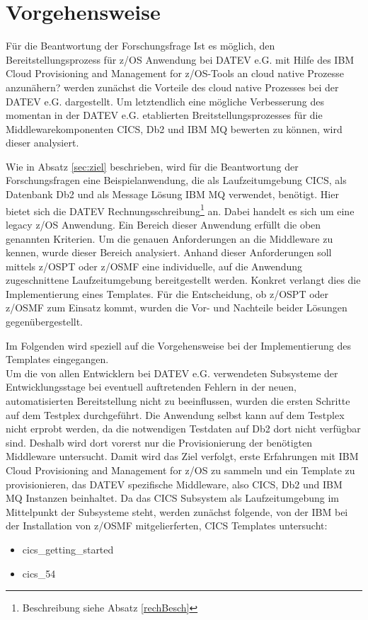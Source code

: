 \chapter{Vorgehensweise}\label{ch:vorgehensweise}
Für die Beantwortung der Forschungsfrage \glqq Ist es möglich, den Bereitstellungsprozess für z/OS Anwendung bei DATEV e.G. mit Hilfe des \glqq IBM Cloud Provisioning and Management for z/OS\grqq-Tools an cloud native Prozesse anzunähern?\grqq{} werden zunächst die Vorteile des cloud native Prozesses bei der DATEV e.G. dargestellt.
Um letztendlich eine mögliche Verbesserung des momentan in der DATEV e.G. etablierten Breitstellungsprozesses für die Middlewarekomponenten CICS, Db2 und IBM MQ bewerten zu können, wird dieser analysiert.

Wie in Absatz \ref{sec:ziel} beschrieben, wird für die Beantwortung der Forschungsfragen eine Beispielanwendung, die als Laufzeitumgebung CICS, als Datenbank Db2 und als Message Lösung IBM MQ verwendet, benötigt.
Hier bietet sich die \glqq DATEV Rechnungsschreibung\grqq{}\footnote{Beschreibung siehe Absatz \ref{rechBesch}} an.
Dabei handelt es sich um eine legacy z/OS Anwendung. Ein Bereich dieser Anwendung erfüllt die oben genannten Kriterien.
Um die genauen Anforderungen an die Middleware zu kennen, wurde dieser Bereich analysiert.
Anhand dieser Anforderungen soll mittels z/OSPT oder z/OSMF eine individuelle, auf die Anwendung zugeschnittene Laufzeitumgebung bereitgestellt werden.
Konkret verlangt dies die Implementierung eines Templates.
Für die Entscheidung, ob z/OSPT oder z/OSMF zum Einsatz kommt, wurden die Vor- und Nachteile beider Lösungen gegenübergestellt.

Im Folgenden wird speziell auf die Vorgehensweise bei der Implementierung des Templates eingegangen.\\
Um die von allen Entwicklern bei DATEV e.G. verwendeten Subsysteme der Entwicklungsstage bei eventuell auftretenden Fehlern in der neuen, automatisierten Bereitstellung nicht zu beeinflussen, wurden die ersten Schritte auf dem Testplex durchgeführt.
Die Anwendung selbst kann auf dem Testplex nicht erprobt werden, da die notwendigen Testdaten auf Db2 dort nicht verfügbar sind.
Deshalb wird dort vorerst nur die Provisionierung der benötigten Middleware untersucht.
Damit wird das Ziel verfolgt, erste Erfahrungen mit \glqq IBM Cloud Provisioning and Management for z/OS\grqq{} zu sammeln und ein Template zu provisionieren, das DATEV spezifische Middleware, also CICS, Db2 und IBM MQ Instanzen beinhaltet. 
Da das CICS Subsystem als Laufzeitumgebung im Mittelpunkt der Subsysteme steht, werden zunächst folgende, von der IBM bei der Installation von z/OSMF mitgelierferten, CICS Templates untersucht:
\begin{itemize}
\item \glqq cics\_getting\_started\grqq
\item \glqq cics\_54\grqq
\end{itemize}


